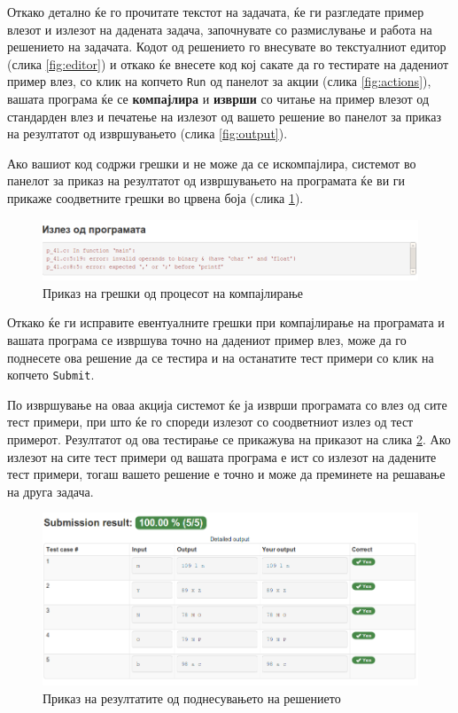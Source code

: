 Откако детално ќе го прочитате текстот на задачата, ќе ги разгледате пример
влезот и излезот на дадената задача, започнувате со размислување и работа на
решението на задачата. Кодот од решението го внесувате во текстуалниот едитор
(слика \ref{fig:editor}) и откако ќе внесете код кој сакате да го тестирате на
дадениот пример влез, со клик на копчето \texttt{Run} од панелот за акции
(слика \ref{fig:actions}), вашата програма ќе се \textbf{компајлира} и
\textbf{изврши} со читање на пример влезот од стандарден влез и печатење на
излезот од вашето решение во панелот за приказ на резултатот од извршувањето
(слика \ref{fig:output}).

Ако вашиот код содржи грешки и не може да се искомпајлира, системот во панелот
за приказ на резултатот од извршувањето на програмата ќе ви ги прикаже
соодветните грешки во црвена боја (слика \ref{fig:errors}).

\begin{figure}[htbp]
\centering
\includegraphics[scale=.4]{images/code/errors}
\caption{Приказ на грешки од процесот на компајлирање}
\label{fig:errors}
\end{figure}

Откако ќе ги исправите евентуалните грешки при компајлирање на програмата и
вашата програма се извршува точно на дадениот пример влез, може да го поднесете
ова решение да се тестира и на останатите тест примери со клик на копчето
\texttt{Submit}.

По извршување на оваа акција системот ќе ја изврши програмата со влез од сите
тест примери, при што ќе го спореди излезот со соодветниот излез од тест
примерот. Резултатот од ова тестирање се прикажува на приказот на слика
\ref{fig:results}. Ако излезот на сите тест примери од вашата програма е ист со
излезот на дадените тест примери, тогаш вашето решение е точно и може да
преминете на решавање на друга задача.

\begin{figure}[htbp]
\centering
\includegraphics[scale=.4]{images/code/results}
\caption{Приказ на резултатите од поднесувањето на решението}
\label{fig:results}
\end{figure}

